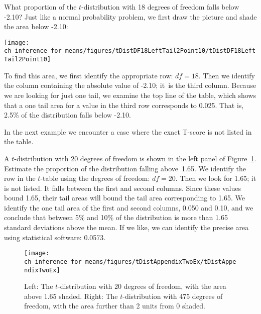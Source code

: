 \begin{examplewrap}
\begin{nexample}{What proportion of the $t$-distribution with
    18 degrees of freedom falls below -2.10?}
  Just like a normal probability problem, we first draw the
  picture and shade the area below -2.10:
  \begin{center}
  \texttt{[image: ch\_inference\_for\_means/figures/tDistDF18LeftTail2Point10/tDistDF18LeftTail2Point10]}
  \end{center}
  To find this area, we first identify the appropriate row:
  $df = 18$.
  Then we identify the column containing the absolute value
  of -2.10;
  it~is the third column.
  Because we are looking for just one tail, we examine the
  top line of the table, which shows that a one tail area
  for a value in the third row corresponds to 0.025.
  That is, 2.5\% of the distribution falls below -2.10.

  In the next example we encounter a case where the exact
  T-score is not listed in the table.
\end{nexample}
\end{examplewrap}

\begin{examplewrap}
\begin{nexample}{A $t$-distribution with 20 degrees of freedom
    is shown in the left panel of
    Figure~\ref{tDistAppendixTwoEx}.
    Estimate the proportion of the distribution falling
    above~1.65.}
  We identify the row in the $t$-table using the degrees
  of freedom: $df=20$.
  Then we look for 1.65; it is not listed.
  It falls between the first and second columns.
  Since these values bound 1.65, their tail areas will
  bound the tail area corresponding to 1.65.
  We identify the one tail area of the first and
  second columns, 0.050 and 0.10, and we conclude that
  between 5\% and 10\% of the distribution is more than
  1.65 standard deviations above the mean.
  If we like, we can identify the precise area using
  statistical software: 0.0573.
\end{nexample}
\end{examplewrap}

\begin{figure}[h]
\centering
\texttt{[image: ch\_inference\_for\_means/figures/tDistAppendixTwoEx/tDistAppendixTwoEx]}
\caption{Left: The $t$-distribution with 20 degrees of freedom,
    with the area above 1.65 shaded.
    Right: The $t$-distribution with 475 degrees of freedom,
    with the area further than 2 units from 0 shaded.}
\label{tDistAppendixTwoEx}
\end{figure}

